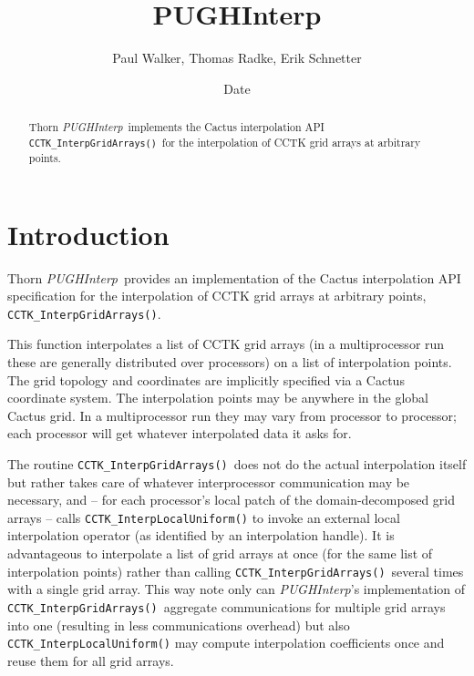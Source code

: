 \documentclass{article}
\begin{document}
\title{PUGHInterp}
\author{Paul Walker, Thomas Radke, Erik Schnetter}
\date{$ $Date$ $}

\maketitle


\newcommand{\InterpGridArrays}{{\tt CCTK\_\-Interp\-Grid\-Arrays()}}
\newcommand{\PUGHInterp}{{\it PUGH\-Interp}}

\begin{abstract}
Thorn \PUGHInterp\ implements the Cactus interpolation API \InterpGridArrays\
for the interpolation of CCTK grid arrays at arbitrary points.
\end{abstract}

\section{Introduction}
Thorn \PUGHInterp\ provides an implementation of the Cactus interpolation API
specification for the interpolation of CCTK grid arrays at arbitrary points,
\InterpGridArrays.

This function interpolates a list of CCTK grid arrays (in a multiprocessor run
these are generally distributed over processors) on a list of interpolation
points. The grid topology and coordinates are implicitly specified via a Cactus
coordinate system.
The interpolation points may be anywhere in the global Cactus grid.
In a multiprocessor run they may vary from processor to processor;
each processor will get whatever interpolated data it asks for.

The routine \InterpGridArrays\ does not do the actual interpolation
itself but rather takes care of whatever interprocessor communication may be
necessary, and -- for each processor's local patch of the domain-decomposed grid
arrays -- calls {\tt CCTK\_InterpLocalUniform()} to invoke an external
local interpolation operator (as identified by an interpolation handle).
It is advantageous to interpolate a list of grid arrays at once (for the same
list of interpolation points) rather than calling \InterpGridArrays\ several
times with a single grid array. This way note only can \PUGHInterp's
implementation of \InterpGridArrays\ aggregate communications for multiple grid
arrays into one (resulting in less communications overhead) but also
{\tt CCTK\_InterpLocalUniform()} may compute interpolation coefficients once
and reuse them for all grid arrays.
\end{document}
